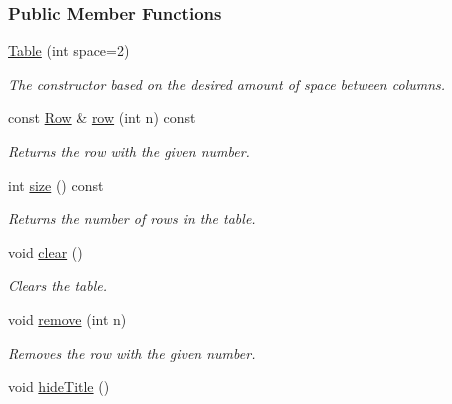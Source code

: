 \subsubsection*{Public Member Functions}
\begin{DoxyCompactItemize}
\item 
\hyperlink{structTable_a24d7e2ccf7dedb134a3292a16cd8c8dd}{Table} (int space=2)\hypertarget{structTable_a24d7e2ccf7dedb134a3292a16cd8c8dd}{}\label{structTable_a24d7e2ccf7dedb134a3292a16cd8c8dd}

\begin{DoxyCompactList}\small\item\em The constructor based on the desired amount of space between columns. \end{DoxyCompactList}\item 
const \hyperlink{structRow}{Row} \& \hyperlink{structTable_a1d0a32d9ac2ac965004696358bf3f331}{row} (int n) const 
\begin{DoxyCompactList}\small\item\em Returns the row with the given number. \end{DoxyCompactList}\item 
int \hyperlink{structTable_a2c5420361660d9e787487de8d6eb9e44}{size} () const 
\begin{DoxyCompactList}\small\item\em Returns the number of rows in the table. \end{DoxyCompactList}\item 
void \hyperlink{structTable_a92ce3dba95a8dcf634ef57b1081b8647}{clear} ()\hypertarget{structTable_a92ce3dba95a8dcf634ef57b1081b8647}{}\label{structTable_a92ce3dba95a8dcf634ef57b1081b8647}

\begin{DoxyCompactList}\small\item\em Clears the table. \end{DoxyCompactList}\item 
void \hyperlink{structTable_ae3f3b22a2b4e766ea06e9f4f7c56ec6d}{remove} (int n)
\begin{DoxyCompactList}\small\item\em Removes the row with the given number. \end{DoxyCompactList}\item 
void \hyperlink{structTable_a8158d90f88d1c8d56cdc3becc92aa592}{hide\+Title} ()\hypertarget{structTable_a8158d90f88d1c8d56cdc3becc92aa592}{}\label{structTable_a8158d90f88d1c8d56cdc3becc92aa592}


\end{DoxyCompactItemize}
